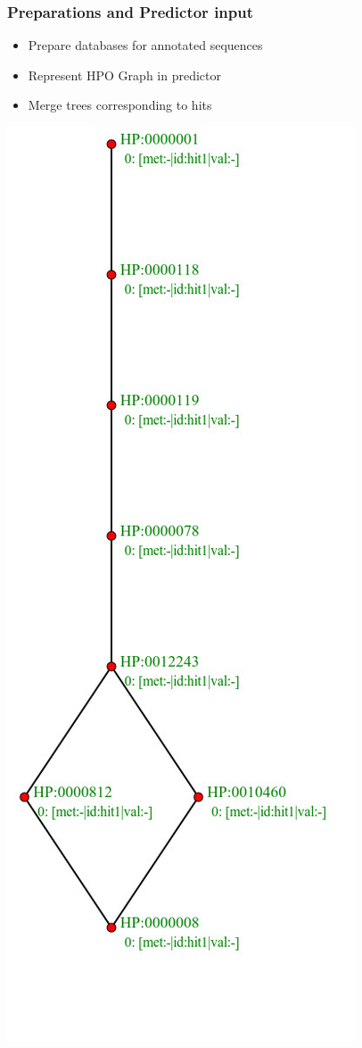\documentclass{beamer}
\begin{document}
\begin{frame}
	\frametitle{Preparations and Predictor input}
		\begin{itemize}
			\item Prepare databases for annotated sequences
			\item Represent HPO Graph in predictor
			\item Merge trees corresponding to hits
		\end{itemize}
		\begin{minipage}{0.2\textwidth}
			\includegraphics[width=\textwidth]{p1.jpg}	

\end{minipage}
\end{frame}
\end{document}
